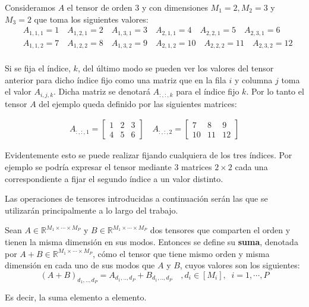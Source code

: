 \begin{ejemplo} \label{ej:tensorejemplo}
Consideramos $A$ el tensor de orden $3$ y con dimensiones $M_1 = 2, M_2 = 3$ y $M_3 = 2$ que toma los siguientes valores: 
\begin{align*}
&A_{1,1,1} = 1 \quad A_{1,2,1} = 2 \quad A_{1,3,1} = 3 \quad A_{2,1,1} = 4 \quad A_{2,2,1} = 5 \quad A_{2,3,1} = 6 \\
&A_{1,1,2} = 7 \quad A_{1,2,2} = 8 \quad A_{1,3,2} = 9 \quad A_{2,1,2} = 10 \quad A_{2,2,2} = 11 \quad A_{2,3,2} = 12 \\ 
\end{align*}

Si se fija el índice, $k$, del último modo se pueden ver los valores del tensor anterior para dicho índice fijo como una matriz que en la fila $i$ y columna $j$ toma el valor $A_{i,j,k}$. Dicha matriz se denotará $A_{:,:,k}$ para el índice fijo $k$. Por lo tanto el tensor $A$ del ejemplo queda definido por las siguientes matrices:

\begin{align*}
A_{:,:,1} = \begin{bmatrix}
1 & 2 & 3 \\
4 & 5 & 6 
\end{bmatrix} \quad
A_{:,:,2} = \begin{bmatrix}
7 & 8 & 9 \\
10 & 11 & 12 
\end{bmatrix}
\end{align*}

Evidentemente esto se puede realizar fijando cualquiera de los tres índices. Por ejemplo se podría expresar el tensor mediante 3 matrices $2\times 2$ cada una correspondiente a fijar el segundo índice a un valor distinto.
\end{ejemplo}

Las operaciones de tensores introducidas a continuación serán las que se utilizarán principalmente a lo largo del trabajo.

\begin{definicion}
Sean $A\in\mathbb{R}^{M_1\times \cdots \times M_P}$ y $B\in\mathbb{R}^{M_1\times \cdots \times M_P}$ dos tensores que comparten el orden y tienen la misma dimensión en sus modos. Entonces se define su \textbf{suma}, denotada por $A+B\in\mathbb{R}^{M_1\times\cdots \times M_P}$, cómo el tensor que tiene mismo orden y misma dimensión en cada uno de sus modos que $A$ y $B$, cuyos valores son los siguientes:
\begin{equation}
(A + B)_{d_1,..,d_{P}} = A_{d_1,..,d_P} + B_{d_1,..,d_P} \quad, d_i\in[M_i], \;\; i=1,\cdots ,P
\end{equation}

Es decir, la suma elemento a elemento.

\end{definicion}

